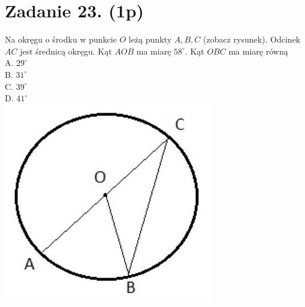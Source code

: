 \documentclass[10pt]{article}
\begin{document}
\section*{Zadanie 23. (1p)}
Na okręgu o środku w punkcie \(O\) leżą punkty \(A, B, C\) (zobacz rysunek). Odcinek \(A C\) jest średnicą okręgu. Kąt \(A O B\) ma miarę \(58^{\circ}\). Kąt \(O B C\) ma miarę równą\\
A. \(29^{\circ}\)\\
B. \(31^{\circ}\)\\
C. \(39^{\circ}\)\\
D. \(41^{\circ}\)\\
\includegraphics[max width=\textwidth, center]{2024_11_21_b63ac6eb3d78a57ac924g-07}
\end{document}

